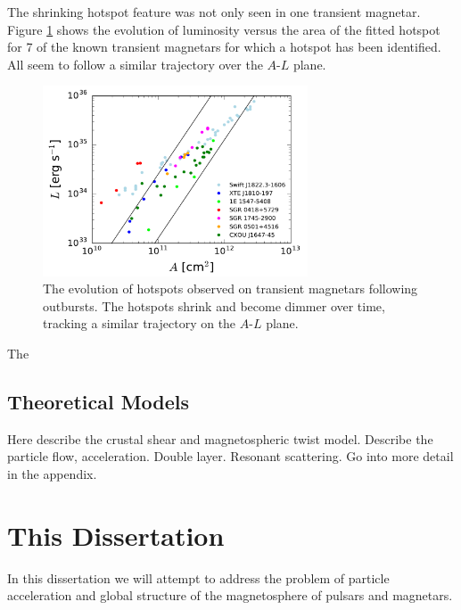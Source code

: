 The shrinking hotspot feature was not only seen in one transient magnetar.
Figure \ref{fig:hotspots} shows the evolution of luminosity versus the area of
the fitted hotspot for 7 of the known transient magnetars for which a hotspot
has been identified. All seem to follow a similar trajectory over the $A$-$L$ plane.

\begin{figure}[h]
  \centering
  \includegraphics[width=0.7\textwidth]{pics/intro/hot-spot.png}
  \caption[The evolution of hotspots observed on transient magnetars following
    outbursts.]{The evolution of hotspots observed on transient magnetars following
    outbursts. The hotspots shrink and become dimmer over time, tracking a
    similar trajectory on the $A$-$L$ plane. \citep{beloborodov_magnetar_2016}}
  \label{fig:hotspots}
\end{figure}


The


\subsection{Theoretical Models}
\label{sec:intro-magnetar-theory}

Here describe the crustal shear and magnetospheric twist model. Describe the
particle flow, acceleration. Double layer. Resonant scattering. Go into more
detail in the appendix.

\section{This Dissertation}
\label{sec:intro-outline}

In this dissertation we will attempt to address the problem of particle
acceleration and global structure of the magnetosphere of pulsars and
magnetars.

